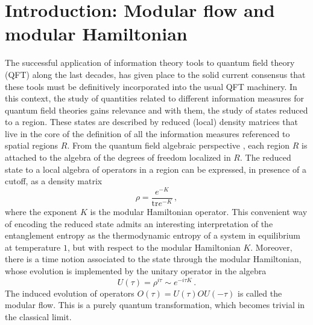 \documentclass[12pt,a4paper]{article}
\newcommand{\be}{\begin{equation}}
\newcommand{\ee}{\end{equation}}
\def\be{\begin{equation}}
\def\ee{\end{equation}}
\begin{document}


\section{Introduction: Modular flow and modular Hamiltonian} \label{intro}

The successful application of information theory tools to quantum field theory (QFT) along the last decades, has given place to the solid current consensus that these tools must be definitively incorporated into the usual QFT machinery. In this context, the study of quantities related to different information measures for quantum field theories gains relevance and with them, the study of states reduced to a region. These states are described by reduced (local) density matrices that live in the core of the definition of all the information measures referenced to spatial regions $R$. From the quantum field algebraic perspective \cite{Haag}, each region $R$ is attached to the algebra of the degrees of freedom localized in $R$. The reduced state to a local algebra of operators in a region can be expressed, in presence of a cutoff, as a density matrix 
\be
\rho= \frac{e^{-K}}{\textrm{tr}e^{-K}}\,, \label{termal}
\ee
where the exponent $K$ is the modular Hamiltonian operator. This convenient way of
encoding the reduced state admits an interesting interpretation of the entanglement entropy as the thermodynamic entropy of a system in equilibrium at temperature $1$, but with respect to the modular Hamiltonian $K$. Moreover, there is a time notion associated to the state through the modular Hamiltonian, whose evolution is implemented by the unitary operator in the algebra
\be
U(\tau)=\rho^{i \tau}\sim e^{-i \tau K}\,. \label{modflow}
\ee      
The induced evolution of operators $O(\tau)= U(\tau) O U(-\tau)$ is called the modular flow. This is a purely quantum transformation, which becomes trivial in the classical limit. 
 
\end{document}
